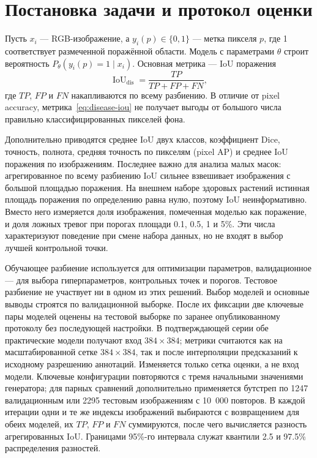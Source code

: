 \documentclass[a4paper,12pt]{extarticle}
\begin{document}
\section{Постановка задачи и протокол оценки}

Пусть $x_i$ --- RGB-изображение, а $y_i(p)\in\{0,1\}$ --- метка пикселя $p$,
где 1 соответствует размеченной поражённой области. Модель с параметрами
$\theta$ строит вероятность $P_\theta(y_i(p)=1\mid x_i)$. Основная метрика ---
IoU поражения
\begin{equation}
  \operatorname{IoU}_{\mathrm{dis}} =
  \frac{TP}{TP+FP+FN},
  \label{eq:disease-iou}
\end{equation}
где $TP$, $FP$ и $FN$ накапливаются по всему разбиению. В отличие от pixel
accuracy, метрика~\eqref{eq:disease-iou} не получает выгоды от большого числа
правильно классифицированных пикселей фона.

Дополнительно приводятся среднее IoU двух классов, коэффициент Dice, точность,
полнота, средняя точность по пикселям (pixel AP) и среднее IoU поражения по
изображениям. Последнее важно для анализа малых масок: агрегированное по всему
разбиению IoU сильнее взвешивает изображения с большой площадью поражения.
На внешнем наборе здоровых растений истинная площадь поражения по определению
равна нулю, поэтому IoU неинформативно. Вместо него измеряется доля изображения,
помеченная моделью как поражение, и доля ложных тревог при порогах площади
0.1, 0.5, 1 и 5\%. Эти числа характеризуют поведение при смене набора данных,
но не входят в выбор лучшей контрольной точки.

Обучающее разбиение используется для оптимизации параметров, валидационное ---
для выбора гиперпараметров, контрольных точек и порогов. Тестовое разбиение не участвует ни
в одном из этих решений.
Выбор моделей и основные выводы строятся по валидационной выборке. После их
фиксации две ключевые пары моделей оценены на тестовой выборке по заранее опубликованному
протоколу без последующей настройки. В подтверждающей серии обе
практические модели получают вход $384\times384$; метрики считаются как на
масштабированной сетке $384\times384$, так и после интерполяции предсказаний к
исходному разрешению аннотаций. Изменяется только сетка оценки, а не вход
модели. Ключевые конфигурации
повторяются с тремя начальными значениями генератора; для парных сравнений
дополнительно применяется бутстреп по 1247 валидационным или 2295 тестовым
изображениям с 10~000 повторов.
В каждой итерации одни и те же индексы изображений выбираются с возвращением
для обеих моделей, их $TP$, $FP$ и $FN$ суммируются, после чего вычисляется
разность агрегированных IoU. Границами 95\%-го интервала служат квантили 2.5 и
97.5\% распределения разностей.
\end{document}

